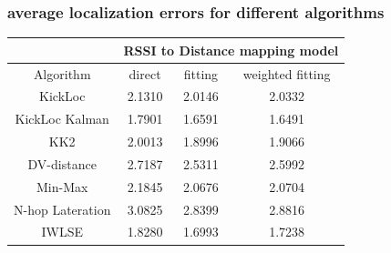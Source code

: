 \documentclass[11pt]{beamer}
\begin{document}
\begin{frame}
\frametitle{average localization errors for different algorithms }
\begin{tabular}{|c|c|c|c|}
\hline 
 & \multicolumn{3}{c|}{RSSI to Distance mapping model} \\ 
\hline 
Algorithm & direct  & fitting & weighted fitting \\ 
\hline 
KickLoc & 2.1310 & 2.0146 & 2.0332 \\
\hline 
KickLoc Kalman & 1.7901  &  1.6591  &  1.6491 \\
\hline 
KK2 & 2.0013 &   1.8996  &  1.9066 \\
\hline
DV-distance & 2.7187 & 2.5311 & 2.5992  \\
\hline
Min-Max & 2.1845  &  2.0676  &  2.0704  \\
\hline
N-hop Lateration & 3.0825  &  2.8399  & 2.8816  \\
\hline
IWLSE & 1.8280  &  1.6993  & 1.7238  \\
\hline
\end{tabular} 
\end{frame}
\end{document}
